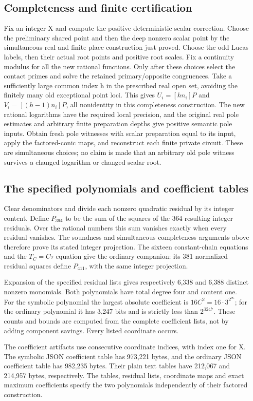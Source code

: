 \subsection{Completeness and finite certification}
Fix an integer X and compute the positive deterministic scalar correction.
Choose the preliminary shared point and then the deep nonzero scalar
point by the simultaneous real and finite-place construction just proved.
Choose the odd Lucas labels, then their actual root points and positive
root scales. Fix a continuity modulus for all the new rational functions.
Only after these choices select the contact primes and solve the retained
primary/opposite congruences. Take a sufficiently large common index h in the prescribed real open
set, avoiding the finitely many old exceptional point loci. This gives
$U_i=[hn_i]P$ and $V_i=[(h-1)n_i]P$, all nonidentity in this completeness
construction. The new rational logarithms have the required local
precision, and the original real pole estimates and arbitrary finite
preparation depths give positive semantic pole inputs. Obtain fresh
pole witnesses with scalar preparation equal to its input, apply the
factored-conic maps, and reconstruct each
finite private circuit. These are simultaneous choices; no claim is
made that an arbitrary old pole witness survives a changed logarithm
or changed scalar root.

\subsection{The specified polynomials and coefficient tables}
Clear denominators and divide each nonzero quadratic residual by its
integer content. Define $P_{394}$ to be the sum of the squares of the
364 resulting integer residuals. Over the rational numbers this sum
vanishes exactly when every residual vanishes. The soundness and
simultaneous completeness arguments above therefore prove its stated
integer projection. The sixteen constant-chain equations and the
$T_C=C\tau$ equation give the ordinary companion: its 381 normalized
residual squares define $P_{411}$, with the same integer projection.

Expansion of the specified residual lists gives respectively 6,338 and
6,388 distinct nonzero monomials. Both polynomials have total degree
four and content one. For the symbolic polynomial the largest absolute
coefficient is $16C^2=16\cdot3^{2^{26}}$; for the ordinary polynomial it
has 3,247 bits and is strictly less than $2^{3247}$. These counts and
bounds are computed from the complete coefficient lists, not by adding
component savings. Every listed coordinate occurs.

The coefficient artifacts use consecutive coordinate indices, with
index one for X. The symbolic JSON coefficient table has 973,221 bytes,
and the ordinary JSON coefficient table has 982,235 bytes. Their plain
text tables have 212,067 and 214,957 bytes, respectively. The tables,
residual lists, coordinate maps and exact maximum coefficients specify
the two polynomials independently of their factored construction.
